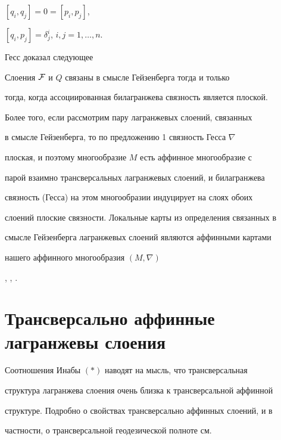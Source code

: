 $[q_i,q_j] = 0 =[p_i,p_j]$,


$[q_i, p_j] = {\delta}^i_j$, $i,j = 1, \dotsc, n$.





Гесс \cite{HE} доказал следующее





\begin{prop}


Слоения $\cal F$ и $Q$ связаны в смысле Гейзенберга тогда и только


тогда, когда ассоциированная билагранжева связность является плоской.


\end{prop}





Более того, если рассмотрим пару лагранжевых слоений, связанных


в смысле Гейзенберга, то по предложению 1 связность Гесса $\nabla$


плоская, и поэтому многообразие $M$ есть аффинное многообразие с


парой взаимно трансверсальных лагранжевых слоений, и билагранжева


связность (Гесса) на этом многообразии индуцирует на слоях обоих


слоений плоские связности. Локальные карты из определения связанных в


смысле Гейзенберга лагранжевых слоений являются аффинными картами


нашего аффинного многообразия $(M, \nabla)$


\cite{HE}, \cite{BO0}, \cite{BO}.





\section{Трансверсально аффинные лагранжевы слоения}





Соотношения Инабы $(*)$ наводят на мысль, что трансверсальная


структура лагранжева слоения очень близка к трансверсальной аффинной


структуре. Подробно о свойствах трансверсально аффинных слоений, и в


частности, о трансверсальной геодезической полноте см.


